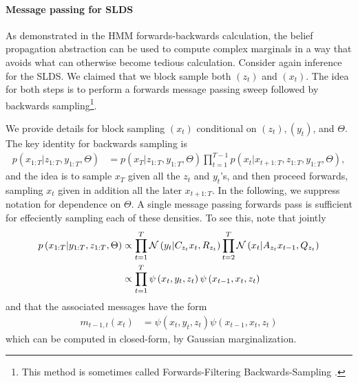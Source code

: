 \documentclass[14pt]{extreport}
\begin{document}
\paragraph{Message passing for SLDS}

As demonstrated in the HMM forwards-backwards calculation, the belief
propagation abstraction can be used to compute complex marginals in a way that
avoids what can otherwise become tedious calculation. Consider again inference
for the SLDS. We claimed that we block sample both $\left(z_t\right)$ and
$\left(x_t\right)$. The idea for both steps is to perform a forwards message
passing sweep followed by backwards sampling\footnote{This method is sometimes
  called Forwards-Filtering Backwards-Sampling \citep{carter1994gibbs}.}.

We provide details for block sampling $\left(x_t\right)$ conditional on
$\left(z_t\right), \left(y_t\right)$, and $\Theta$. The key identity for
backwards sampling is
\begin{align*}
  p\left(x_{1:T} \vert z_{1:T}, y_{1:T}, \Theta\right) &= p\left(x_{T} \vert z_{1:T}, y_{1:T}, \Theta\right) \prod_{t = 1}^{T - 1} p\left(x_{t} \vert x_{t + 1:T}, z_{1:T}, y_{1:T}, \Theta\right),
\end{align*}
and the idea is to sample $x_{T}$ given all the $z_{t}$ and $y_{t}$'s, and then
proceed forwards, sampling $x_{t}$ given in addition all the later $x_{t +
  1:T}$. In the following, we suppress notation for dependence on $\Theta$. A
single message passing forwards pass is sufficient for effeciently sampling each
of these densities. To see this, note that jointly
\begin{align*}
  p\left(x_{1:T} \vert y_{1:T}, z_{1:T}, \Theta\right) &\propto
  \prod_{t = 1}^{T} \mathcal{N}\left(y_t \vert C_{z_t} x_t, R_{z_t}\right) \prod_{t = 2}^{T} \mathcal{N}\left(x_{t} \vert A_{z_t} x_{t - 1}, Q_{z_t}\right) \\
    &\propto\prod_{t = 1}^{T} \psi\left(x_{t}, y_{t}, z_{t}\right) \psi\left(x_{t - 1}, x_{t}, z_{t}\right)
\end{align*}
and that the associated messages have the form
\begin{align*}
  m_{t - 1, t}\left(x_t\right) &= \psi\left(x_{t} , y_t, z_t\right)\psi\left(x_{t - 1}, x_t, z_t\right)
\end{align*}
which can be computed in closed-form, by Gaussian marginalization.
\end{document}

